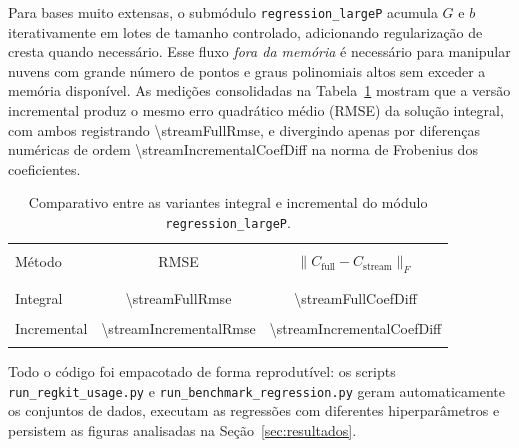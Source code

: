 Para bases muito extensas, o submódulo \texttt{regression\_largeP} acumula $G$ e
$b$ iterativamente em lotes de tamanho controlado, adicionando regularização de
cresta quando necessário. Esse fluxo \textit{fora da memória} é necessário para
manipular nuvens com grande número de pontos e graus polinomiais altos sem
exceder a memória disponível. As medições consolidadas na
Tabela~\ref{tab:streaming} mostram que a versão incremental produz o mesmo erro
quadrático médio (RMSE) da solução integral,
com ambos registrando
\num[scientific-notation=true,round-mode=figures,round-precision=3]{\streamFullRmse},
e divergindo apenas por diferenças numéricas de ordem
\num[scientific-notation=true,round-mode=figures,round-precision=2]{\streamIncrementalCoefDiff}
na norma de Frobenius dos coeficientes.

\begin{table}[H]
    \centering
    \caption{Comparativo entre as variantes integral e incremental do módulo
    \texttt{regression\_largeP}.}
    \label{tab:streaming}
    \begin{tabular}{lcc}
        \hline\\
        Método & RMSE & $\|C_{\text{full}} - C_{\text{stream}}\|_F$\\\\
        \hline\\
        Integral & \num[scientific-notation=true,round-mode=figures,round-precision=3]{\streamFullRmse} & \num{\streamFullCoefDiff}\\\\
        Incremental & \num[scientific-notation=true,round-mode=figures,round-precision=3]{\streamIncrementalRmse} & \num[scientific-notation=true,round-mode=figures,round-precision=2]{\streamIncrementalCoefDiff}\\\\
        \hline
    \end{tabular}
\end{table}

Todo o código foi empacotado de forma reprodutível: os scripts
\texttt{run\_regkit\_usage.py} e \texttt{run\_benchmark\_regression.py}
geram automaticamente os conjuntos de dados, executam as regressões com
diferentes hiperparâmetros e persistem as figuras analisadas na
Seção~\ref{sec:resultados}.
